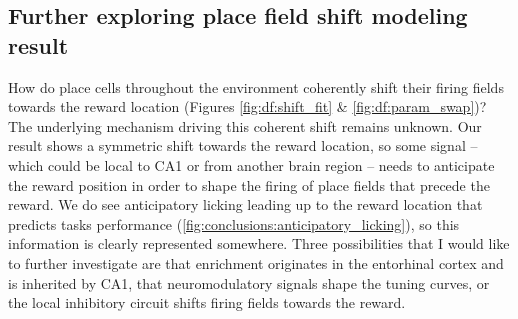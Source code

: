 \subsection{Further exploring place field shift modeling result}
How do place cells throughout the environment coherently shift their firing fields towards the reward location (Figures \ref{fig:df:shift_fit} \& \ref{fig:df:param_swap})?
The underlying mechanism driving this coherent shift remains unknown.
Our result shows a symmetric shift towards the reward location, so some signal -- which could be local to CA1 or from another brain region -- needs to anticipate the reward position in order to shape the firing of place fields that precede the reward.
We do see anticipatory licking leading up to the reward location that predicts tasks performance (\autoref{fig:conclusions:anticipatory_licking}), so this information is clearly represented somewhere.
Three possibilities that I would like to further investigate are that enrichment originates in the entorhinal cortex and is inherited by CA1, that neuromodulatory signals shape the tuning curves, or the local inhibitory circuit shifts firing fields towards the reward.

